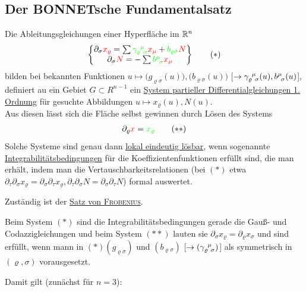 \subsection{Der BONNETsche Fundamentalsatz}
Die Ableitungsgleichungen einer Hyperfläche im \(\mathbb{R}^n\) 
\begin{align*}
 \begin{Bmatrix}
  \partial_\sigma {\color{red}x_\varrho} = \sum {\color{green}\gamma_{\varrho \;\, \sigma}^{\;\, \mu}} {\color{red}x_\mu} + {\color{green}b_{\varrho \sigma}} {\color{red}N} \\
  \partial_\sigma {\color{red}N} = - \sum {\color{green}b^{\mu}_{\;\, \sigma}} {\color{red}x_\mu}  
 \end{Bmatrix} \tag {\(\ast\)}
\end{align*}
bilden bei {\color{green}bekannten} Funktionen \(u \mapsto \big(g_{\varrho \sigma}(u)\big), \big(b_{\varrho \sigma}(u)\big)\) [\(\to \gamma_{\varrho \;\, \sigma}^{\;\, \mu} (u), b^{\mu}_{\;\, \sigma} (u)\)], definiert au ein Gebiet \(G \subset R^{n-1}\) ein \uline{System partieller Differentialgleichungen 1. Ordnung} für {\color{red}gesuchte} Abbildungen \(u \mapsto x_\varrho(u), N(u)\). \\
Aus diesen lässt sich die Fläche selbst gewinnen durch Lösen des Systems
\begin{align*}
 \partial_\varrho {\color{red}x} = {\color{green}x_{\varrho}} \tag{\(\ast \ast\)}
\end{align*}
Solche Systeme sind genau dann \uline{lokal eindeutig lösbar}, wenn sogenannte \uline{Integrabilitätsbedingungen} für die Koeffizientenfunktionen erfüllt sind, die man erhält, indem man die Vertauschbarkeitsrelationen (bei \((\ast)\) etwa \(\partial_\tau \partial_\sigma x_\varrho = \partial_\sigma \partial_\tau x_\varrho, \partial_\tau \partial_\sigma N = \partial_\sigma \partial_\tau N\)) formal auswertet.\par
Zuständig ist der \uline{Satz von \textsc{Frobenius}}. \par
Beim System \((\ast)\) sind die Integrabilitätsbedingungen gerade die Gauß- und Codazzigleichungen und beim System \((\ast \ast)\) lauten sie \(\partial_\sigma x_\varrho = \partial_\varrho x_\sigma\) und sind erfüllt, wenn mann in \((\ast) (g_{\varrho \sigma})\) und \((b_{\varrho \sigma})\) [\(\to (\gamma_{\varrho \;\, \sigma}^{\;\, \mu})\)] als symmetrisch in \((\varrho, \sigma)\) vorausgesetzt. \par
Damit gilt (zunächst für \(n = 3\)):
  
  

